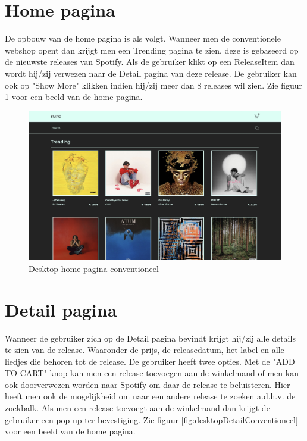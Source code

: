 \pagebreak

\section{Home pagina}

De opbouw van de home pagina is als volgt. Wanneer men de conventionele webshop opent dan krijgt men een Trending pagina te zien, deze is gebaseerd op de nieuwste releases van Spotify. Als de gebruiker klikt op een ReleaseItem dan wordt hij/zij verwezen naar de Detail pagina van deze release. De gebruiker kan ook op "Show More" klikken indien hij/zij meer dan 8 releases wil zien. Zie figuur \ref{fig:desktopHomeConventioneel} voor een beeld van de home pagina.

\begin{figure}
	\centering
	\includegraphics[width=1\linewidth]{graphics/desktopHomeConventioneel}
	\caption[Desktop home pagina conventioneel]{Desktop home pagina conventioneel}
	\label{fig:desktopHomeConventioneel}
\end{figure}

\section{Detail pagina}

Wanneer de gebruiker zich op de Detail pagina bevindt krijgt hij/zij alle details te zien van de release. Waaronder de prijs, de releasedatum, het label en alle liedjes die behoren tot de release. De gebruiker heeft twee opties. Met de "ADD TO CART" knop kan men een release toevoegen aan de winkelmand of men kan ook doorverwezen worden naar Spotify om daar de release te beluisteren. Hier heeft men ook de mogelijkheid om naar een andere release te zoeken a.d.h.v. de zoekbalk. Als men een release toevoegt aan de winkelmand dan krijgt de gebruiker een pop-up ter bevestiging. Zie figuur \ref{fig:desktopDetailConventioneel} voor een beeld van de home pagina.

